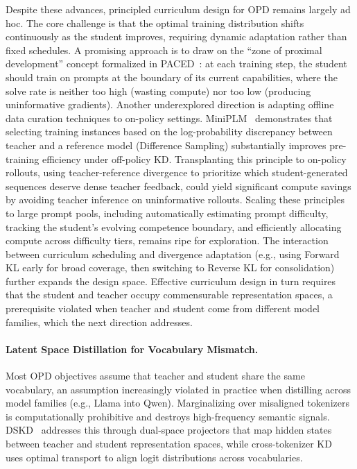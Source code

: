 \documentclass{article} %
\begin{document}
Despite these advances, principled curriculum design for OPD remains largely ad hoc. The core challenge is that the optimal training distribution shifts continuously as the student improves, requiring dynamic adaptation rather than fixed schedules. A promising approach is to draw on the ``zone of proximal development'' concept formalized in PACED~\citep{2603.11178}: at each training step, the student should train on prompts at the boundary of its current capabilities, where the solve rate is neither too high (wasting compute) nor too low (producing uninformative gradients). Another underexplored direction is adapting offline data curation techniques to on-policy settings. MiniPLM~\citep{2410.17215} demonstrates that selecting training instances based on the log-probability discrepancy between teacher and a reference model (Difference Sampling) substantially improves pre-training efficiency under off-policy KD. Transplanting this principle to on-policy rollouts, using teacher-reference divergence to prioritize which student-generated sequences deserve dense teacher feedback, could yield significant compute savings by avoiding teacher inference on uninformative rollouts. Scaling these principles to large prompt pools, including automatically estimating prompt difficulty, tracking the student's evolving competence boundary, and efficiently allocating compute across difficulty tiers, remains ripe for exploration. The interaction between curriculum scheduling and divergence adaptation (e.g., using Forward KL early for broad coverage, then switching to Reverse KL for consolidation) further expands the design space. Effective curriculum design in turn requires that the student and teacher occupy commensurable representation spaces, a prerequisite violated when teacher and student come from different model families, which the next direction addresses.

\paragraph{Latent Space Distillation for Vocabulary Mismatch.}
Most OPD objectives assume that teacher and student share the same vocabulary, an assumption increasingly violated in practice when distilling across model families (e.g., Llama into Qwen). Marginalizing over misaligned tokenizers is computationally prohibitive and destroys high-frequency semantic signals. DSKD~\citep{2504.11426} addresses this through dual-space projectors that map hidden states between teacher and student representation spaces, while cross-tokenizer KD~\citep{2402.12030} uses optimal transport to align logit distributions across vocabularies.
\end{document}
